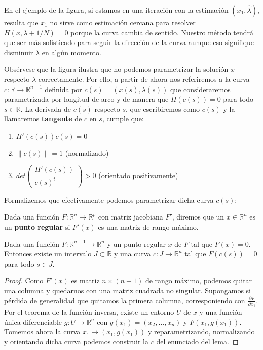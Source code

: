 En el ejemplo de la figura, si estamos en una iteración con la estimación $(x_1, \hat{\lambda})$, resulta que $x_1$ no sirve como estimación cercana para resolver $H(x, \lambda+1/N)=0$ porque la curva cambia de sentido.
Nuestro método tendrá que ser más sofisticado para seguir la dirección de la curva aunque eso signifique disminuir $\lambda$ en algún momento.

Obsérvese que la figura ilustra que no podemos parametrizar la solución $x$ respecto $\lambda$ correctamente.
Por ello, a partir de ahora nos referiremos a la curva $c:\mathbb{R}\to\mathbb{R}^{n+1}$ definida por $c(s)=(x(s),\lambda(s))$ que consideraremos parametrizada por longitud de arco y de manera que $H(c(s))=0$ para todo $s \in \mathbb{R}$.
La derivada de $c(s)$ respecto $s$, que escribiremos como $\dot{c}(s)$ y la llamaremos \textbf{tangente} de $c$ en $s$, cumple que:

\begin{enumerate}
	\item $H'(c(s)) \dot{c}(s)=0$
	\item $\|\dot{c}(s)\|=1$ (normalizado)
	\item $det \begin{pmatrix}
		H'(c(s))\\
		\dot{c}(s)^t
	\end{pmatrix}>0$ (orientado positivamente)
\end{enumerate}

Formalizemos que efectivamente podemos parametrizar dicha curva $c(s)$:

\begin{definition}
	Dada una función $F : \mathbb{R}^n \to \mathbb{R}^p$ con matriz jacobiana $F'$, diremos que un $x\in \mathbb{R}^n$ es un \textbf{punto regular} si $F'(x)$ es una matriz de rango máximo.
\end{definition}

\begin{lemma}
	Dada una función $F : \mathbb{R}^{n+1} \to \mathbb{R}^n$ y un punto regular $x$ de $F$ tal que $F(x)=0$.
	Entonces existe un intervalo $J \subset \mathbb{R}$ y una curva $c: J \to\mathbb{R}^n$ tal que $F(c(s))=0$ para todo $s \in J$.
\end{lemma}
\begin{proof}
	Como $F'(x)$ es matriz $n\times(n+1)$ de rango máximo, podemos quitar una columna y quedarnos con una matriz cuadrada no singular.
	Supongamos si pérdida de generalidad que quitamos la primera columna, corresponiendo con $\frac{\partial F}{\partial x_1}$. 
	Por el teorema de la función inversa, existe un entorno $U$ de $x$ y una función única diferenciable $g : U \to \mathbb{R}^n$ con $g(x_1)=(x_2,\dots,x_n)$ y $F(x_1,g(x_1))$.
	Tomemos ahora la curva $x_1 \mapsto (x_1, g(x_1))$ y reparametrizando, normalizando y orientando dicha curva podemos construir la $c$ del enunciado del lema.
\end{proof}

